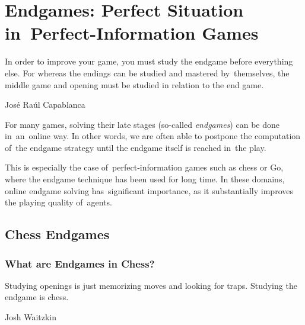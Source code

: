 \chapter{Endgames: Perfect Situation in~Perfect-Information Games}
\epigraph{
  In order to improve your game, you must study the endgame before everything else.
  For whereas the endings can be studied and mastered by~themselves, the middle game and opening must be studied in relation to the end game.
}{José Raúl Capablanca}

For many games, solving their late stages (so-called \emph{endgames}) can be done in~an~online way.
In other words, we are often able to postpone the computation of~the endgame strategy until the endgame itself is reached in~the play.

This is especially the case of~perfect-information games such as chess or Go, where the endgame technique has been used for long time.
In these domains, online endgame solving has~significant importance, as it substantially improves the playing quality of~agents.

\section{Chess Endgames}

\subsection{What are Endgames in Chess?}
\epigraph{
  Studying openings is just memorizing moves and looking for traps.
  Studying the endgame is chess.
}{Josh Waitzkin}

